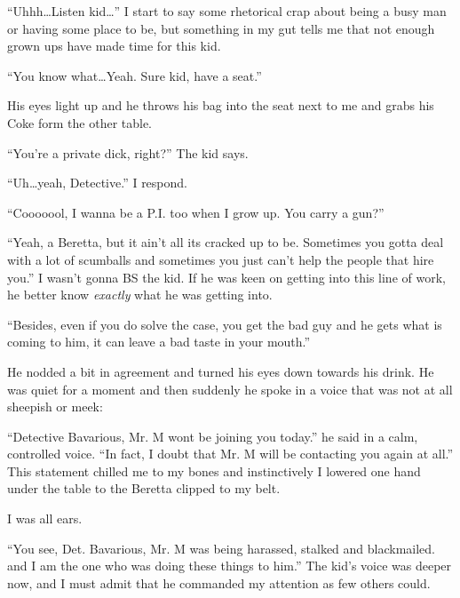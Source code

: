 ``Uhhh{\ldots}Listen kid{\ldots}'' I start to say some rhetorical crap about
being a busy man or having some place to be, but something in my
gut tells me that not enough grown ups have made time for this
kid.



``You know what{\ldots}Yeah. Sure kid, have a seat.''

His eyes light up and he throws his bag into the seat next to me
and grabs his Coke form the other table.



``You're a private dick, right?'' The kid says.



``Uh{\ldots}yeah, Detective.'' I respond.



``Cooooool, I wanna be a P.I. too when I grow up. You carry a
gun?''



``Yeah, a Beretta, but it ain't all its cracked up to be. Sometimes
you gotta deal with a lot of scumballs and sometimes you just can't
help the people that hire you.'' I wasn't gonna BS the kid. If he
was keen on getting into this line of work, he better know
{\em exactly} what he was getting into.



``Besides, even if you do solve the case, you get the bad guy and he
gets what is coming to him, it can leave a bad taste in your
mouth.''



He nodded a bit in agreement and turned his eyes down towards his
drink. He was quiet for a moment and then suddenly he spoke in a
voice that was not at all sheepish or meek:



``Detective Bavarious, Mr. M wont be joining you today.'' he said in
a calm, controlled voice. ``In fact, I doubt that Mr. M will be
contacting you again at all.'' This statement chilled me to my bones
and instinctively I lowered one hand under the table to the Beretta
clipped to my belt.



I was all ears.



``You see, Det. Bavarious, Mr. M was being harassed, stalked and
blackmailed. and I am the one who was doing these things to him.''
The kid's voice was deeper now, and I must admit that he commanded
my attention as few others could.



